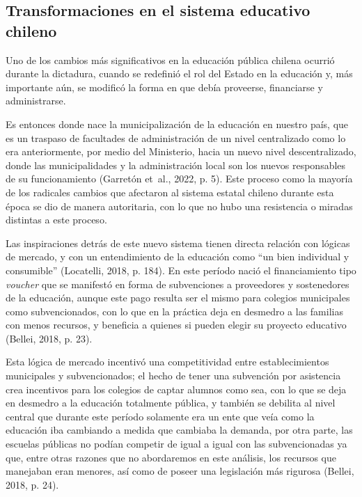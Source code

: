\documentclass[
  12pt,
  letterpaper,
]{article}
\begin{document}
\subsection{Transformaciones en el sistema educativo chileno}\label{transformaciones-en-el-sistema-educativo-chileno}

Uno de los cambios más significativos en la educación pública chilena ocurrió durante la dictadura, cuando se redefinió el rol del Estado en la educación y, más importante aún, se modificó la forma en que debía proveerse, financiarse y administrarse.

Es entonces donde nace la municipalización de la educación en nuestro país, que es un traspaso de facultades de administración de un nivel centralizado como lo era anteriormente, por medio del Ministerio, hacia un nuevo nivel descentralizado, donde las municipalidades y la administración local son los nuevos responsables de su funcionamiento (Garretón et~al., 2022, p. 5).
Este proceso como la mayoría de los radicales cambios que afectaron al sistema estatal chileno durante esta época se dio de manera autoritaria, con lo que no hubo una resistencia o miradas distintas a este proceso.

Las inspiraciones detrás de este nuevo sistema tienen directa relación con lógicas de mercado, y con un entendimiento de la educación como ``un bien individual y consumible'' (Locatelli, 2018, p. 184).
En este período nació el financiamiento tipo \emph{voucher} que se manifestó en forma de subvenciones a proveedores y sostenedores de la educación, aunque este pago resulta ser el mismo para colegios municipales como subvencionados, con lo que en la práctica deja en desmedro a las familias con menos recursos, y beneficia a quienes si pueden elegir su proyecto educativo (Bellei, 2018, p. 23).

Esta lógica de mercado incentivó una competitividad entre establecimientos municipales y subvencionados; el hecho de tener una subvención por asistencia crea incentivos para los colegios de captar alumnos como sea, con lo que se deja en desmedro a la educación totalmente pública, y también se debilita al nivel central que durante este período solamente era un ente que veía como la educación iba cambiando a medida que cambiaba la demanda, por otra parte, las escuelas públicas no podían competir de igual a igual con las subvencionadas ya que, entre otras razones que no abordaremos en este análisis, los recursos que manejaban eran menores, así como de poseer una legislación más rigurosa (Bellei, 2018, p. 24).
\end{document}
